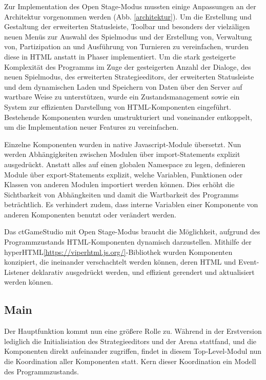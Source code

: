 Zur Implementation des Open Stage-Modus mussten einige Anpassungen an der Architektur vorgenommen
werden (Abb. \ref{architektur}). Um die Erstellung und Gestaltung der erweiterten Statusleiste, Toolbar und besonders der
vielzäligen neuen Menüs zur Auswahl des Spielmodus und der Erstellung von, Verwaltung von,
Partizipation an und Ausführung von Turnieren zu vereinfachen, wurden diese in HTML anstatt in Phaser
implementiert. Um die stark gesteigerte Komplexität des Programms im Zuge der gesteigerten Anzahl
der Dialoge, des neuen Spielmodus, des erweiterten Strategieeditors, der erweiterten Statusleiste
und dem dynamischen Laden und Speichern von Daten über den Server auf wartbare Weise zu
unterstützen, wurde ein Zustandsmanagement sowie ein System zur effizienten Darstellung von
HTML-Komponenten eingeführt. Bestehende Komponenten wurden umstrukturiert und voneinander
entkoppelt, um die Implementation neuer Features zu vereinfachen.

Einzelne Komponenten wurden in native Javascript-Module übersetzt. Nun werden Abhängigkeiten
zwischen Modulen über import-Statements explizit ausgedrückt. Anstatt alles auf einen globalen
Namespace zu legen, definieren Module über export-Statements explizit, welche Variablen, Funktionen
oder Klassen von anderen Modulen importiert werden können. Dies erhöht die Sichtbarkeit von
Abhängkeiten und damit die Wartbarkeit des Programms beträchtlich. Es verhindert zudem, dass interne
Variablen einer Komponente von anderen Komponenten benutzt oder verändert werden.

Das ctGameStudio mit Open Stage-Modus braucht die Möglichkeit, aufgrund des Programmzustands
HTML-Komponenten dynamisch darzustellen. Mithilfe der
hyperHTML\ref{https://viperhtml.js.org/}-Bibliothek wurden Komponenten konzipiert, die ineinander
verschachtelt werden können, deren HTML und Event-Listener deklarativ ausgedrückt werden, und
effizient gerendert und aktualisiert werden können.

\subsection{Main}

Der Hauptfunktion kommt nun eine größere Rolle zu. Während in der Erstversion lediglich die
Initialisiation des Strategieeditors und der Arena stattfand, und die Komponenten direkt aufeinander
zugriffen, findet in diesem Top-Level-Modul nun die Koordination aller Komponenten statt. Kern
dieser Koordination ein Modell des Programmzustands.

